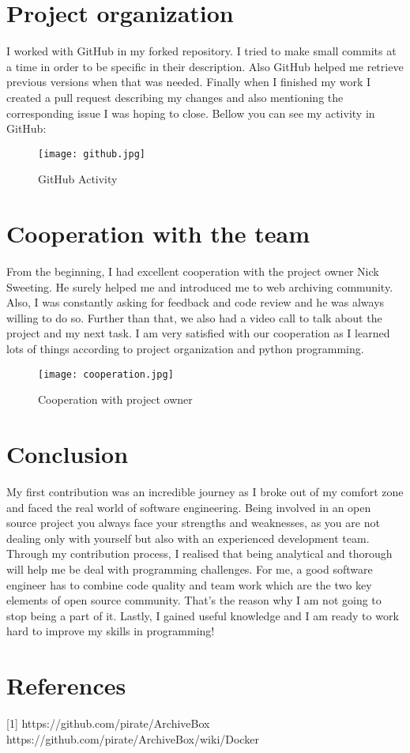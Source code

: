 \documentclass{article}
\begin{document}
\section{Project organization}
I worked with GitHub in my forked repository. I tried to make small commits at a time in order to be specific in their description. Also GitHub helped me retrieve previous versions when that was needed. Finally when I finished my work I created a pull request describing my changes and also mentioning the corresponding issue I was hoping to close. Bellow you can see my activity in GitHub:
\begin{figure}[tph!]
\centerline{\texttt{[image: github.jpg]}}
    \caption{GitHub Activity}
    \label{fig:verticalcell}
\end{figure}
\newline
\section{Cooperation with the team}

From the beginning, I had excellent cooperation with the project owner Nick Sweeting. He surely helped me and introduced me to web archiving community. Also, I was constantly asking for feedback and code review and he was always willing to do so. Further than that, we also had a video call to talk about the project and my next task. I am very satisfied with our cooperation as I learned lots of things according to project organization and python programming. 

\begin{figure}[tph!]
\centerline{\texttt{[image: cooperation.jpg]}}
    \caption{Cooperation with project owner}
    \label{fig:verticalcell}
\end{figure}

\section{Conclusion}
My first contribution was an incredible journey as I broke out of my comfort zone and faced the real world of software engineering. Being involved in an open source project you always face your strengths and weaknesses, as you are not dealing only with yourself but also with an experienced development team.  Through my contribution process, I realised that being analytical and thorough will help me be deal with programming challenges. For me, a good software engineer has to combine code quality and team work which are the two key elements of open source community. That's the reason why I am not going to stop being a part of it. Lastly, I gained useful knowledge and I am ready to work hard to improve my skills in programming!

\section*{References}
[1] https://github.com/pirate/ArchiveBox 
\newline
[2]https://github.com/pirate/ArchiveBox/wiki/Docker
\end{document}
